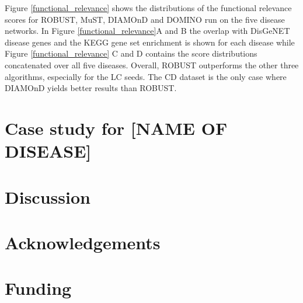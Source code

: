 \documentclass{bioinfo}
\begin{document}
Figure \ref{functional_relevance} shows the distributions of the functional relevance scores for ROBUST, MuST, DIAMOnD and DOMINO run on the five disease networks. In Figure \ref{functional_relevance}A and B the overlap with DisGeNET disease genes and the KEGG gene set enrichment is shown for each disease while Figure \ref{functional_relevance} C and D contains the score distributions concatenated over all five diseases. Overall, ROBUST outperforms the other three algorithms, especially for the LC seeds. The CD dataset is the only case where DIAMOnD yields better results than ROBUST.   

\section{Case study for [NAME OF DISEASE]}


\section{Discussion}


\section*{Acknowledgements}


\section*{Funding}




\end{document}
